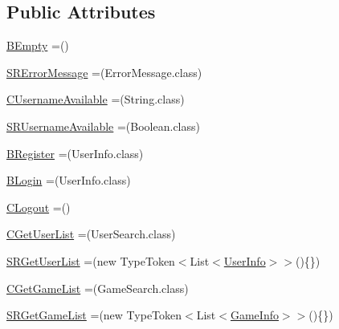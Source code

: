 \subsection*{Public Attributes}
\begin{DoxyCompactItemize}
\item 
\hyperlink{enumpt_1_1up_1_1fe_1_1lpro1613_1_1sharedlib_1_1conn_1_1_query_aa5301799b1d3143c374798784ac198ea}{B\+Empty} =()
\item 
\hyperlink{enumpt_1_1up_1_1fe_1_1lpro1613_1_1sharedlib_1_1conn_1_1_query_a734b96bcfdfad05b25de2a39e20528a9}{S\+R\+Error\+Message} =(Error\+Message.\+class)
\item 
\hyperlink{enumpt_1_1up_1_1fe_1_1lpro1613_1_1sharedlib_1_1conn_1_1_query_ae39b52f0f15ed78e237e84aa822c9a81}{C\+Username\+Available} =(String.\+class)
\item 
\hyperlink{enumpt_1_1up_1_1fe_1_1lpro1613_1_1sharedlib_1_1conn_1_1_query_a0634c9c72d7ac829d414fdc13f34bddd}{S\+R\+Username\+Available} =(Boolean.\+class)
\item 
\hyperlink{enumpt_1_1up_1_1fe_1_1lpro1613_1_1sharedlib_1_1conn_1_1_query_aa20884de85d3b004e5926324f91f95f5}{B\+Register} =(User\+Info.\+class)
\item 
\hyperlink{enumpt_1_1up_1_1fe_1_1lpro1613_1_1sharedlib_1_1conn_1_1_query_a3b8ce58870c62903bab13c13a7eb249a}{B\+Login} =(User\+Info.\+class)
\item 
\hyperlink{enumpt_1_1up_1_1fe_1_1lpro1613_1_1sharedlib_1_1conn_1_1_query_aa40f948ae79a2adcea748969432f2ab3}{C\+Logout} =()
\item 
\hyperlink{enumpt_1_1up_1_1fe_1_1lpro1613_1_1sharedlib_1_1conn_1_1_query_ae3af9d0613ab8d210b7161a550f7bf14}{C\+Get\+User\+List} =(User\+Search.\+class)
\item 
\hyperlink{enumpt_1_1up_1_1fe_1_1lpro1613_1_1sharedlib_1_1conn_1_1_query_ad743a85e754f5d1d070fe30d8cf1ae25}{S\+R\+Get\+User\+List} =(new Type\+Token$<$List$<$\hyperlink{classpt_1_1up_1_1fe_1_1lpro1613_1_1sharedlib_1_1structs_1_1_user_info}{User\+Info}$>$$>$()\{\})
\item 
\hyperlink{enumpt_1_1up_1_1fe_1_1lpro1613_1_1sharedlib_1_1conn_1_1_query_a00dbcd99570bca2872b23d1f77a49186}{C\+Get\+Game\+List} =(Game\+Search.\+class)
\item 
\hyperlink{enumpt_1_1up_1_1fe_1_1lpro1613_1_1sharedlib_1_1conn_1_1_query_aecfe06afd2edfe3f3175db6b0164bdab}{S\+R\+Get\+Game\+List} =(new Type\+Token$<$List$<$\hyperlink{classpt_1_1up_1_1fe_1_1lpro1613_1_1sharedlib_1_1structs_1_1_game_info}{Game\+Info}$>$$>$()\{\})
\item 

\end{DoxyCompactItemize}
